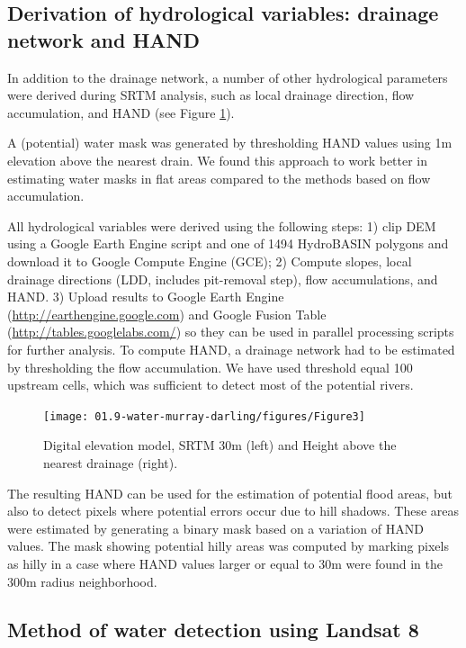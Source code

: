 \subsection{Derivation of hydrological variables: drainage network and HAND}
In addition to the drainage network, a number of other hydrological parameters were derived during SRTM analysis, such as local drainage direction, flow accumulation, and HAND (see Figure \ref{fig:au-dem-hand}). 

A (potential) water mask was generated by thresholding HAND values using 1m elevation above the nearest drain. We found this approach to work better in estimating water masks in flat areas compared to the methods based on flow accumulation.

All hydrological variables were derived using the following steps: 1) clip DEM using a Google Earth Engine script and one of 1494 HydroBASIN polygons and download it to Google Compute Engine (GCE); 2) Compute slopes, local drainage directions (LDD, includes pit-removal step), flow accumulations, and HAND. 3) Upload results to Google Earth Engine (\url{http://earthengine.google.com}) and Google Fusion Table (\url{http://tables.googlelabs.com/}) so they can be used in parallel processing scripts for further analysis. To compute HAND, a drainage network had to be estimated by thresholding the flow accumulation. We have used threshold equal 100 upstream cells, which was sufficient to detect most of the potential rivers. 

\begin{figure}
	\centering
	\texttt{[image: 01.9-water-murray-darling/figures/Figure3]}
	\caption{Digital elevation model, SRTM 30m (left) and Height above the nearest drainage (right).}
	\label{fig:au-dem-hand}
\end{figure}

The resulting HAND can be used for the estimation of potential flood areas, but also to detect pixels where potential errors occur due to hill shadows. These areas were estimated by generating a binary mask based on a variation of HAND values. The mask showing potential hilly areas was computed by marking pixels as hilly in a case where HAND values larger or equal to 30m were found in the 300m radius neighborhood.

\subsection{Method of water detection using Landsat 8}

